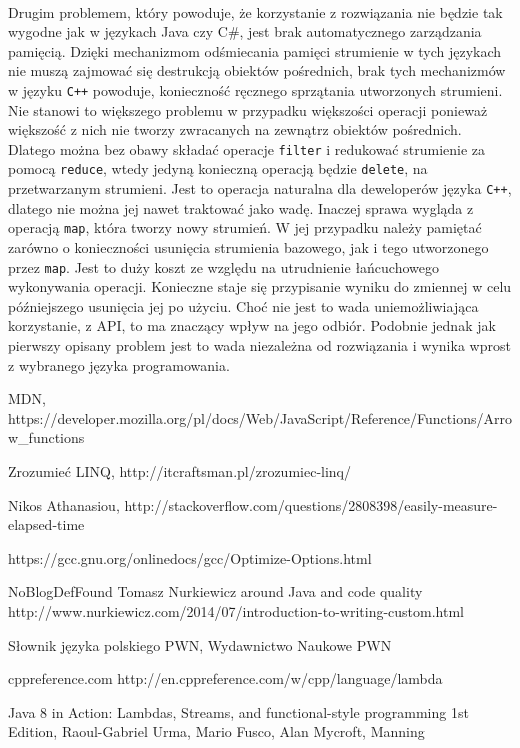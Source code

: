 \documentclass[a4paper,10pt]{report}
\begin{document}
\paragraph{}
Drugim problemem, który powoduje, że korzystanie z rozwiązania nie będzie tak wygodne jak w językach Java czy C\#, jest brak automatycznego zarządzania pamięcią. Dzięki mechanizmom odśmiecania pamięci strumienie w tych językach nie muszą zajmować się destrukcją obiektów pośrednich, brak tych mechanizmów w języku \verb|C++| powoduje, konieczność ręcznego sprzątania utworzonych strumieni. Nie stanowi to większego problemu w przypadku większości operacji ponieważ większość z nich nie tworzy zwracanych na zewnątrz obiektów pośrednich. Dlatego można bez obawy składać operacje \verb|filter| i redukować strumienie za pomocą \verb|reduce|, wtedy jedyną konieczną operacją będzie \verb|delete|, na przetwarzanym strumieni. Jest to operacja naturalna dla deweloperów języka \verb|C++|, dlatego nie można jej nawet traktować jako wadę. Inaczej sprawa wygląda z operacją \verb|map|, która tworzy nowy strumień. W jej przypadku należy pamiętać zarówno o konieczności usunięcia strumienia bazowego, jak i tego utworzonego przez \verb|map|. Jest to duży koszt ze względu na utrudnienie łańcuchowego wykonywania operacji. Konieczne staje się przypisanie wyniku do zmiennej w celu późniejszego usunięcia jej po użyciu. Choć nie jest to wada uniemożliwiająca korzystanie, z API, to ma znaczący wpływ na jego odbiór. Podobnie jednak jak pierwszy opisany problem jest to wada niezależna od rozwiązania i wynika wprost z wybranego języka programowania.
\begin{thebibliography}{9}

	MDN,
	https://developer.mozilla.org/pl/docs/Web/JavaScript/Reference/Functions\linebreak/Arrow\_functions
	
	
	Zrozumieć LINQ,
	http://itcraftsman.pl/zrozumiec-linq/
	
	Nikos Athanasiou,
	http://stackoverflow.com/questions/2808398/easily-measure-elapsed-time
	
	https://gcc.gnu.org/onlinedocs/gcc/Optimize-Options.html


	NoBlogDefFound Tomasz Nurkiewicz around Java and code quality
	http://www.nurkiewicz.com/2014/07/introduction-to-writing-custom.html

	Słownik języka polskiego PWN,
	Wydawnictwo Naukowe PWN
	
	cppreference.com
	http://en.cppreference.com/w/cpp/language/lambda
	
	Java 8 in Action: Lambdas, Streams, and functional-style programming 1st Edition,
	Raoul-Gabriel Urma, Mario Fusco, Alan Mycroft,
	Manning
	
\end{thebibliography}
\end{document}
